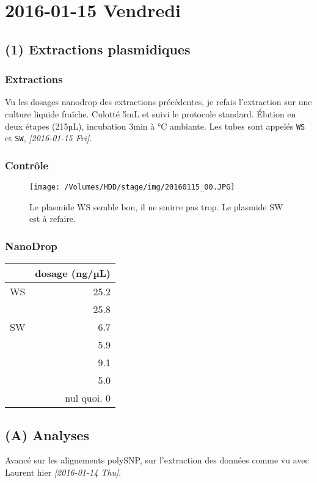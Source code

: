 \documentclass[9pt, oneside, twocolumn]{scrartcl}
\begin{document}
\section{2016-01-15 Vendredi}
\label{sec:orgheadline44}
\subsection{(1) Extractions plasmidiques}
\label{sec:orgheadline42}
\subsubsection{Extractions}
\label{sec:orgheadline39}
Vu les dosages nanodrop des extractions précédentes, je refais l'extraction sur
une culture liquide fraîche. Culotté 5mL et suivi le protocole standard. Élution
en deux étapes (2\texttimes{}15µL), incubation 3min à °C ambiante. Les tubes sont
appelés \texttt{WS} et \texttt{SW}, \textit{[2016-01-15 Fri]}.

\subsubsection{Contrôle}
\label{sec:orgheadline40}

\begin{figure}[htb]
\centering
\texttt{[image: /Volumes/HDD/stage/img/20160115\_00.JPG]}
\caption{Le plasmide WS semble bon, il ne smirre pas trop. Le plasmide SW est à refaire. }
\end{figure}

\subsubsection{NanoDrop}
\label{sec:orgheadline41}
\begin{center}
\begin{tabular}{lr}
\toprule
 & dosage (ng/µL)\\
\midrule
WS & 25.2\\
 & 25.8\\
\midrule
SW & 6.7\\
 & 5.9\\
 & 9.1\\
 & 5.0\\
 & nul quoi. 0\\
\bottomrule
\end{tabular}
\end{center}
\subsection{(A) Analyses}
\label{sec:orgheadline43}
Avancé sur les alignements polySNP, sur l'extraction des données comme vu avec
Laurent hier \textit{[2016-01-14 Thu]}. 
\end{document}
